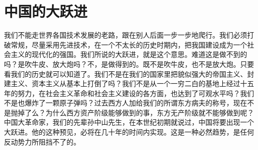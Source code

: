 \section[中国的大跃进（一九六四年十二月）]{中国的大跃进}


我们不能走世界各国技术发展的老路，跟在别人后面一步一步地爬行。我们必须打破常规，尽量采用先进技术，在一个不太长的历史时期内，把我国建设成为一个社会主义的现代化的强国。我们所说的大跃进，就是这个意思。难道这是做不到的吗？是吹牛皮、放大炮吗？不，是做得到的。既不是吹牛皮，也不是放大炮。只要看我们的历史就可以知道了。我们不是在我们的国家里把貌似强大的帝国主义、封建主义、资本主义从基本上打倒了吗？我们不是从一个一穷二白的基地上经过十五年的努力，在社会主义革命和社会主义建设的各方面，也达到了可观水平吗？我们不是也爆炸了一颗原子弹吗？过去西方人加给我们的所谓东方病夫的称号，现在不是抛掉了么？为什么西方资产阶级能够做到的事，东方无产阶级就不能够做到呢？中国大革命家，我们的先辈孙中山先生，在本世纪初期就说过，中国将要出现一个大跃进。他的这种预见，必将在几十年的时间内实现。这是一种必然趋势，是任何反动势力所阻挡不了的。


